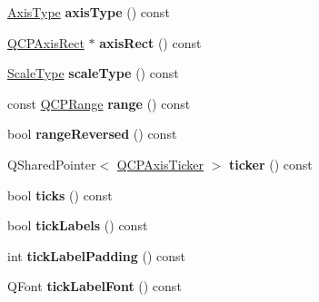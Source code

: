 \begin{DoxyCompactItemize}
\item 
\mbox{\label{class_q_c_p_axis_aa19679359783c5ecd27757b7e5619976}} 
\hyperlink{class_q_c_p_axis_ae2bcc1728b382f10f064612b368bc18a}{Axis\+Type} {\bfseries axis\+Type} () const
\item 
\mbox{\label{class_q_c_p_axis_afc94bcfdf8adfe8e01013f13bdf159a2}} 
\hyperlink{class_q_c_p_axis_rect}{Q\+C\+P\+Axis\+Rect} $\ast$ {\bfseries axis\+Rect} () const
\item 
\mbox{\label{class_q_c_p_axis_ad23e9ad97b44e9aeaf4fab8904280098}} 
\hyperlink{class_q_c_p_axis_a36d8e8658dbaa179bf2aeb973db2d6f0}{Scale\+Type} {\bfseries scale\+Type} () const
\item 
\mbox{\label{class_q_c_p_axis_ac4058855a81f1a883cf2e754f6a6acb1}} 
const \hyperlink{class_q_c_p_range}{Q\+C\+P\+Range} {\bfseries range} () const
\item 
\mbox{\label{class_q_c_p_axis_ab9866dd1a78f1920f491ec12a794bec2}} 
bool {\bfseries range\+Reversed} () const
\item 
\mbox{\label{class_q_c_p_axis_a2d2f3bb4290705cbdd24b4eba70fd805}} 
Q\+Shared\+Pointer$<$ \hyperlink{class_q_c_p_axis_ticker}{Q\+C\+P\+Axis\+Ticker} $>$ {\bfseries ticker} () const
\item 
\mbox{\label{class_q_c_p_axis_a5c3da767a2dc990f200856a9e27ea06e}} 
bool {\bfseries ticks} () const
\item 
\mbox{\label{class_q_c_p_axis_ae4158bbc52939ee52cdb12b805860a28}} 
bool {\bfseries tick\+Labels} () const
\item 
\mbox{\label{class_q_c_p_axis_afac7316ca35941e7080f98e0022c1891}} 
int {\bfseries tick\+Label\+Padding} () const
\item 
\mbox{\label{class_q_c_p_axis_a09f339b7125cf1094920f86687b88236}} 
Q\+Font {\bfseries tick\+Label\+Font} () const
\item 
\mbox{\label{class_q_c_p_axis_a9e21b2326bb2de0b7a8efcd1efc0ce78}} 

\end{DoxyCompactItemize}
